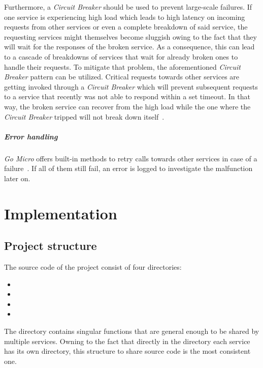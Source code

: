 \documentclass[12pt,a4paper,twoside]{report}
\begin{document}
Furthermore, a \textit{Circuit Breaker} should be used to prevent large-scale failures.
If one service is experiencing high load which leads to high latency on incoming
requests from other services or even a complete breakdown of said service,
the requesting services might themselves become sluggish owing to the fact
that they will wait for the responses of the broken service.
As a consequence, this can lead to a cascade of breakdowns of services that wait for
already broken ones to handle their requests. To mitigate that problem,
the aforementioned \textit{Circuit Breaker} pattern can be utilized.
Critical requests towards other services are getting invoked through
a \textit{Circuit Breaker} which will prevent subsequent requests to
a service that recently was not able to respond within a set timeout.
In that way, the broken service can recover from the high load
while the one where the \textit{Circuit Breaker} tripped will not
break down itself~\cite{fowler-circuit-breaker}.

\paragraph{Error handling}
\textit{Go Micro} offers built-in methods to retry calls towards
other services in case of a failure~\cite{go-micro}. If all of them still fail,
an error is logged to investigate the malfunction later on.



\chapter{Implementation} \label{chap:implementation}



\section{Project structure}

The source code of the project consist of four directories:
\begin{itemize}[noitemsep]
\item {}
\item {}
\item {}
\item {}
\end{itemize}
The  directory contains singular functions that are general
enough to be shared by multiple services. Owning to the fact that directly in the
 directory each service has its own directory, this structure
to share source code is the most consistent one.
\end{document}
